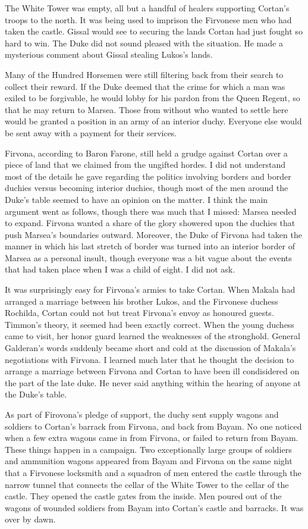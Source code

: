 \documentclass{article}
\begin{document}
The White Tower was empty, all but a handful of healers supporting Cortan's troops to the north. It was being used to imprison the Firvonese men who had taken the castle. Gissal would see to securing the lands Cortan had just fought so hard to win. The Duke did not sound pleased with the situation. He made a mysterious comment about Gissal stealing Lukos's lands. 

Many of the Hundred Horsemen were still filtering back from their search to collect their reward. If the Duke deemed that the crime for which a man was exiled to be forgivable, he would lobby for his pardon from the Queen Regent, so that he may return to Marsea. Those from without who wanted to settle here would be granted a position in an army of an interior duchy. Everyone else would be sent away with a payment for their services. 

Firvona, according to Baron Farone, still held a grudge against Cortan over a piece of land that we claimed from the ungifted hordes. I did not understand most of the details he gave regarding the politics involving borders and border duchies versus becoming interior duchies, though most of the men around the Duke's table seemed to have an opinion on the matter. I think the main argument went as follows, though there was much that I missed: Marsea needed to expand. Firvona wanted a share of the glory showered upon the duchies that push Marsea's boundaries outward. Moreover, the Duke of Firvona had taken the manner in which his last stretch of border was turned into an interior border of Marsea as a personal insult, though everyone was a bit vague about the events that had taken place when I was a child of eight. I did not ask. 

It was surprisingly easy for Firvona's armies to take Cortan. When Makala had arranged a marriage between his brother Lukos, and the Firvonese duchess Rochilda, Cortan could not but treat Firvona's envoy as honoured guests. Timmon's theory, it seemed had been exactly correct. When the young duchess came to visit, her honor guard learned the weaknesses of the stronghold. General Galderan's words suddenly became short and cold at the discussion of Makala's negotiations with Firvona. I learned much later that he thought the decision to arrange a marriage between Firvona and Cortan to have been ill condisidered on the part of the late duke. He never said anything within the hearing of anyone at the Duke's table.

As part of Firovona's pledge of support, the duchy sent supply wagons and soldiers to Cortan's barrack from Firvona, and back from Bayam. No one noticed when a few extra wagons came in from Firvona, or failed to return from Bayam. These things happen in a campaign. Two exceptionally large groups of soldiers and ammunition wagons appeared from Bayam and Firvona on the same night that a Firvonese locksmith and a squadron of men entered the castle through the narrow tunnel that connects the cellar of the White Tower to the cellar of the castle. They opened the castle gates from the inside. Men poured out of the wagons of wounded soldiers from Bayam into Cortan's castle and barracks. It was over by dawn.
\end{document}
